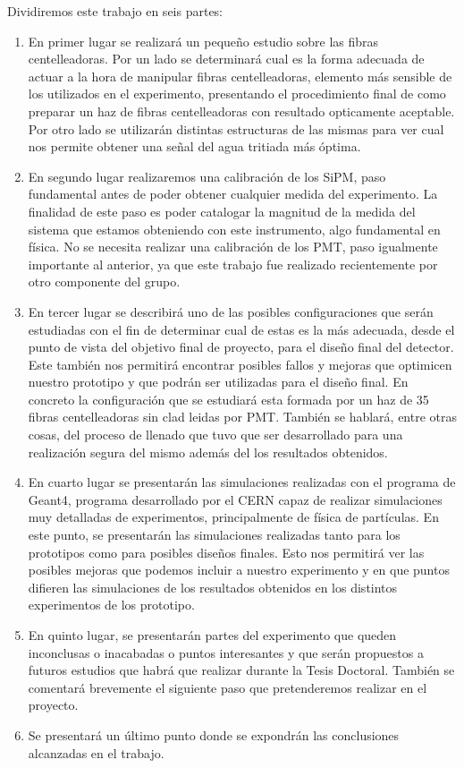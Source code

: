 Dividiremos este trabajo en seis partes:
\begin{enumerate}
\item{} En primer lugar se realizará un pequeño estudio sobre las fibras centelleadoras. Por un lado se determinará cual es la forma adecuada de actuar a la hora de manipular fibras centelleadoras, elemento más sensible de los utilizados en el experimento, presentando el procedimiento final de como preparar un haz de fibras centelleadoras con resultado opticamente aceptable. Por otro lado se utilizarán distintas estructuras de las mismas para ver cual nos permite obtener una señal del agua tritiada  más óptima. 

\item{} En segundo lugar realizaremos una calibración de los SiPM, paso fundamental antes de poder obtener cualquier medida del experimento. La finalidad de este paso es poder catalogar la magnitud de la medida del sistema que estamos obteniendo con este instrumento, algo fundamental en física. No se necesita realizar una calibración de los PMT, paso igualmente importante al anterior, ya que este trabajo fue realizado recientemente por otro componente del grupo.

\item{} En tercer lugar se describirá uno de las posibles configuraciones que serán estudiadas con el fin de determinar cual de estas es la más adecuada, desde el punto de vista del objetivo final de proyecto, para el diseño final del detector. Este también nos permitirá encontrar posibles fallos y mejoras que optimicen nuestro prototipo y que podrán ser utilizadas para el diseño final. En concreto la configuración que se estudiará esta formada por un haz de 35 fibras centelleadoras sin clad leidas por PMT. También se hablará, entre otras cosas, del proceso de llenado que tuvo que ser desarrollado para una realización segura del mismo además del los resultados obtenidos.

\item{} En cuarto lugar se presentarán las simulaciones realizadas con el programa de Geant4\cite{Geant4a,Geant4b,Geant4c}, programa desarrollado por el CERN capaz de realizar simulaciones muy detalladas de experimentos, principalmente de física de partículas. En este punto, se presentarán las simulaciones realizadas tanto para los prototipos como para posibles diseños finales. Esto nos permitirá ver las posibles mejoras que podemos incluir a nuestro experimento y en que puntos difieren  las simulaciones de los resultados obtenidos en los distintos experimentos de los prototipo.

\item{} En quinto lugar, se presentarán partes del experimento que queden inconclusas o inacabadas o puntos interesantes y que serán propuestos a futuros estudios que habrá que realizar durante la Tesis Doctoral. También se comentará brevemente el siguiente paso que pretenderemos realizar en el proyecto.

\item{} Se presentará un último punto donde se expondrán las conclusiones alcanzadas en el trabajo.

\end{enumerate}